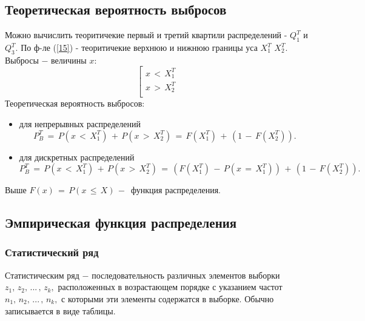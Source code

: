 \subsection{Теоретическая вероятность выбросов}
\begin{flushleft}
	Можно вычислить теоритичекие первый и третий квартили распределений - $Q_1^T$ и $Q_3^T$. По ф-ле (\ref{15}) - теоритичекие верхнюю и нижнюю границы уса $X_1^T$ $X_2^T$. Выбросы $-$ величины $x$: \\
	\begin{equation}
		\label{16} \left[
		\begin{gathered}
			x \, < \, X_1^T \\
			x \, > \, X_2^T \\
		\end{gathered}
		\right.
	\end{equation}
	Теоретическая вероятность выбросов:
	\begin{itemize}
	\item для непрерывных распределений
	\begin{equation}
		\label{17} P_B^T \, =\, P(x \,<\, X_1^T)\,+\, P(x \,>\, X_2^T)\,=\, F(X_1^T)\,+\,\left(1\,-\, F(X_2^T)\right).
	\end{equation}
	\item для дискретных распределений
	\begin{equation}
		\label{18} P_B^T \, =\, P(x \,<\, X_1^T)\,+\, P(x \,>\, X_2^T)\,=\,\left(F(X_1^T)\,-\, P(x \,=\, X_1^T)\right)\,+\,\left(1\,-\, F(X_2^T)\right).
	\end{equation}
	\end{itemize}
	Выше $ F(x)\,=\, P(x \,\leq\, X)\,-\, $ функция распределения.
\end{flushleft}

\subsection{Эмпирическая функция распределения}
\subsubsection{Статистический ряд}
\begin{flushleft}
	Статистическим ряд $-$ последовательность различных элементов выборки $z_1,\, z_2,\,...\,,\, z_k,$ расположенных в возрастающем порядке с указанием частот $n_1,\, n_2,\,...\,,\, n_k,$ с которыми эти элементы содержатся в выборке. Обычно записывается в виде таблицы.
\end{flushleft}

